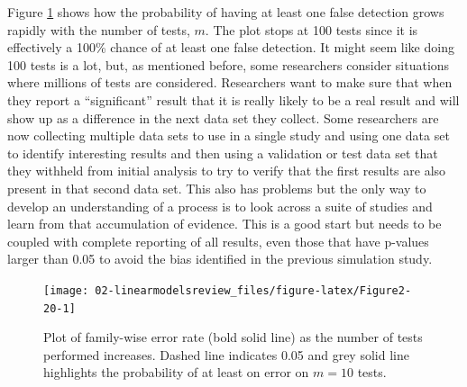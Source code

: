 \documentclass[
]{book}
\begin{document}
Figure \ref{fig:Figure2-20} shows how the probability of having at least one
false detection grows rapidly with the number of tests, \(m\). The plot stops at 100
tests since it is effectively a 100\% chance of at least one false detection.
It might seem like doing 100 tests is a lot, but, as mentioned before, some researchers consider situations where millions of tests are
considered. Researchers want to make sure that when they report a ``significant'' result that
it is really likely to be a real result and will show up as a difference in the
next data set they collect. Some researchers are now collecting multiple data
sets to use in a single study and using one data set to identify interesting
results and then using a validation or test data set that they withheld from
initial analysis to try to verify that the first results are also present in that
second data set. This also has problems but the only way to develop an understanding of a process is to look across a suite of studies and learn from that accumulation of evidence. This is a good start but needs to be coupled with complete reporting of all results, even those that have p-values larger than 0.05 to avoid the bias identified in the previous simulation study.



\begin{figure}[ht!]

{\centering \texttt{[image: 02-linearmodelsreview\_files/figure-latex/Figure2-20-1]} 

}

\caption{Plot of family-wise error rate (bold solid line) as the number of tests performed increases. Dashed line indicates 0.05 and grey solid line highlights the probability of at least on error on \(m = 10\) tests.}\label{fig:Figure2-20}
\end{figure}
\end{document}

